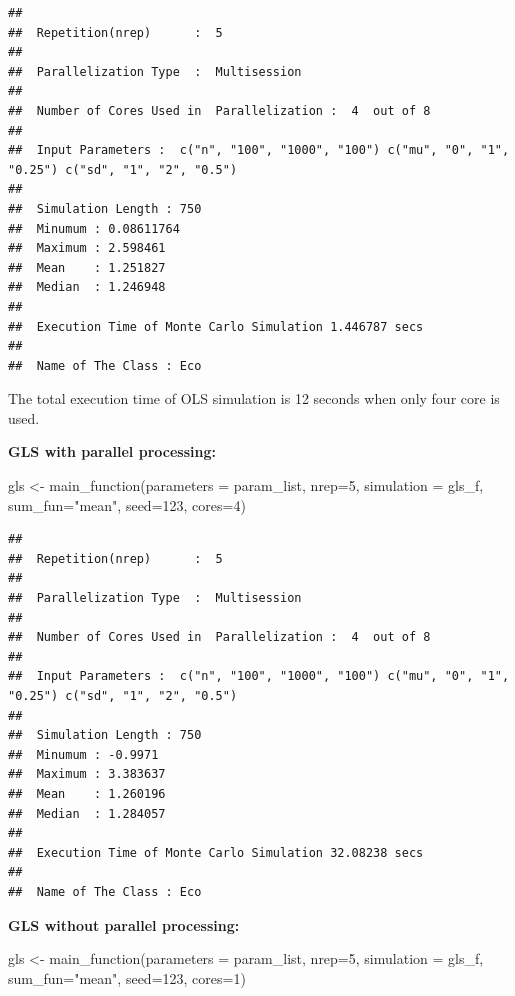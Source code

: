 \documentclass[11pt,a4paper]{article}
\newenvironment{Shaded}{\begin{snugshade}}{\end{snugshade}}
\newcommand{\AttributeTok}[1]{\textcolor[rgb]{0.77,0.63,0.00}{#1}}
\newcommand{\DecValTok}[1]{\textcolor[rgb]{0.00,0.00,0.81}{#1}}
\newcommand{\FunctionTok}[1]{\textcolor[rgb]{0.00,0.00,0.00}{#1}}
\newcommand{\NormalTok}[1]{#1}
\newcommand{\OtherTok}[1]{\textcolor[rgb]{0.56,0.35,0.01}{#1}}
\newcommand{\StringTok}[1]{\textcolor[rgb]{0.31,0.60,0.02}{#1}}
\begin{document}
\begin{verbatim}
## 
##  Repetition(nrep)      :  5 
## 
##  Parallelization Type  :  Multisession 
## 
##  Number of Cores Used in  Parallelization :  4  out of 8 
## 
##  Input Parameters :  c("n", "100", "1000", "100") c("mu", "0", "1", "0.25") c("sd", "1", "2", "0.5") 
## 
##  Simulation Length : 750 
##  Minumum : 0.08611764 
##  Maximum : 2.598461 
##  Mean    : 1.251827 
##  Median  : 1.246948 
## 
##  Execution Time of Monte Carlo Simulation 1.446787 secs 
## 
##  Name of The Class : Eco
\end{verbatim}

The total execution time of OLS simulation is 12 seconds when only four
core is used.

\textbf{GLS with parallel processing:}

\begin{Shaded}
\begin{Highlighting}[]
\NormalTok{gls }\OtherTok{\textless{}{-}} \FunctionTok{main\_function}\NormalTok{(}\AttributeTok{parameters =}\NormalTok{ param\_list,}
                     \AttributeTok{nrep=}\DecValTok{5}\NormalTok{,}
                     \AttributeTok{simulation =}\NormalTok{ gls\_f,}
                     \AttributeTok{sum\_fun=}\StringTok{"mean"}\NormalTok{,}
                     \AttributeTok{seed=}\DecValTok{123}\NormalTok{,}
                     \AttributeTok{cores=}\DecValTok{4}\NormalTok{)}
\end{Highlighting}
\end{Shaded}

\begin{verbatim}
## 
##  Repetition(nrep)      :  5 
## 
##  Parallelization Type  :  Multisession 
## 
##  Number of Cores Used in  Parallelization :  4  out of 8 
## 
##  Input Parameters :  c("n", "100", "1000", "100") c("mu", "0", "1", "0.25") c("sd", "1", "2", "0.5") 
## 
##  Simulation Length : 750 
##  Minumum : -0.9971 
##  Maximum : 3.383637 
##  Mean    : 1.260196 
##  Median  : 1.284057 
## 
##  Execution Time of Monte Carlo Simulation 32.08238 secs 
## 
##  Name of The Class : Eco
\end{verbatim}

\textbf{GLS without parallel processing:}

\begin{Shaded}
\begin{Highlighting}[]
\NormalTok{gls }\OtherTok{\textless{}{-}} \FunctionTok{main\_function}\NormalTok{(}\AttributeTok{parameters =}\NormalTok{ param\_list,}
                     \AttributeTok{nrep=}\DecValTok{5}\NormalTok{,}
                     \AttributeTok{simulation =}\NormalTok{ gls\_f,}
                     \AttributeTok{sum\_fun=}\StringTok{"mean"}\NormalTok{,}
                     \AttributeTok{seed=}\DecValTok{123}\NormalTok{,}
                     \AttributeTok{cores=}\DecValTok{1}\NormalTok{)}
\end{Highlighting}
\end{Shaded}
\end{document}
